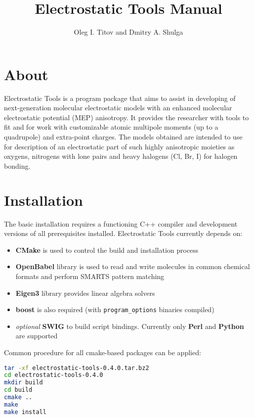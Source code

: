 \documentclass[10pt,a4paper]{article}
\begin{document}
\title{Electrostatic Tools Manual}
\author{Oleg I. Titov and Dmitry A. Shulga}

\maketitle
\newpage

\tableofcontents
\newpage

\section{About}
Electrostatic Tools is a program package that aims to assist in developing of
next-generation molecular electrostatic models with an enhanced molecular 
electrostatic potential (MEP) anisotropy. It provides the researcher with tools to
fit and for work with customizable atomic multipole moments (up to a quadrupole) and
extra-point charges.
The models obtained are intended to use for description of an electrostatic part of 
such highly anisotropic moieties as oxygens, nitrogens with lone pairs and heavy 
halogens (Cl, Br, I) for halogen bonding.
\newpage

\section{Installation}
The basic installation requires a functioning C++ compiler and development versions of all
prerequisites installed. Electrostatic Tools currently depends on:
\begin{itemize}
\item \textbf{CMake} is used to control the build and installation process
\item \textbf{OpenBabel} library is used to read and write molecules in common 
chemical formats and perform SMARTS pattern matching
\item \textbf{Eigen3} library provides linear algebra solvers
\item \textbf{boost} is also required (with \lstinline{program_options} binaries compiled)
\item \textit{optional} \textbf{SWIG} to build script bindings. Currently only 
\textbf{Perl} and \textbf{Python} are supported
\end{itemize}

Common procedure for all cmake-based packages can be applied:
\begin{lstlisting}[language=bash]
tar -xf electrostatic-tools-0.4.0.tar.bz2
cd electrostatic-tools-0.4.0
mkdir build
cd build
cmake ..
make
make install
\end{lstlisting}
\end{document}

